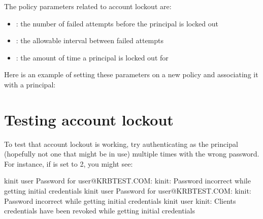 \documentclass[letterpaper,10pt,english]{sphinxmanual}
\begin{document}
The policy parameters related to account lockout are:
\begin{itemize}
\item {} 
{\hyperref[\detokenize{admin/admin_commands/kadmin_local:policy-maxfailure}]{}}: the number of failed attempts
before the principal is locked out

\item {} 
{\hyperref[\detokenize{admin/admin_commands/kadmin_local:policy-failurecountinterval}]{}}: the
allowable interval between failed attempts

\item {} 
{\hyperref[\detokenize{admin/admin_commands/kadmin_local:policy-lockoutduration}]{}}: the amount of time
a principal is locked out for

\end{itemize}

Here is an example of setting these parameters on a new policy and
associating it with a principal:

%
\begin{sphinxVerbatim}[commandchars=\\\{\}]
     
      
    
\end{sphinxVerbatim}


\section{Testing account lockout}
\label{\detokenize{admin/lockout:testing-account-lockout}}
To test that account lockout is working, try authenticating as the
principal (hopefully not one that might be in use) multiple times with
the wrong password.  For instance, if  is set to 2, you
might see:

%
\begin{sphinxVerbatim}[commandchars=\\\{\}]
\PYGZdl{} kinit user
Password for user@KRBTEST.COM:
kinit: Password incorrect while getting initial credentials
\PYGZdl{} kinit user
Password for user@KRBTEST.COM:
kinit: Password incorrect while getting initial credentials
\PYGZdl{} kinit user
kinit: Client\PYGZsq{}s credentials have been revoked while getting initial credentials
\end{sphinxVerbatim}
\end{document}
